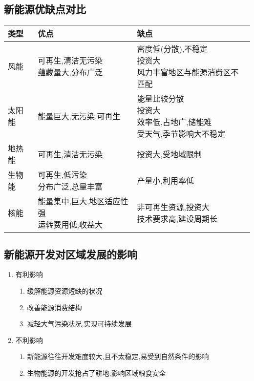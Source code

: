 \documentclass[a4paper]{article}
\begin{document}
    \subsection{新能源优缺点对比}
        \begin{tabular}{|l|l|l}
            \hline
            类型 & 优点 & 缺点 \\
            \hline
            风能 & \makecell[l]{可再生,清洁无污染 \\ 蕴藏量大,分布广泛} & \makecell[l]{密度低(分散),不稳定 \\ 投资大 \\ 风力丰富地区与能源消费区不匹配} \\
            \hline
            太阳能 & 能量巨大,无污染,可再生 & \makecell[l]{能量比较分散 \\ 投资大 \\ 效率低,占地广,储能难 \\ 受天气,季节影响大不稳定} \\
            \hline
            地热能 & 可再生,清洁无污染 & 投资大,受地域限制 \\
            \hline
            生物能 & \makecell[l]{可再生,低污染 \\ 分布广泛,总量丰富} & 产量小,利用率低 \\
            \hline
            核能 & \makecell[l]{能量集中,巨大,地区适应性强 \\ 运转费用低,收益大} & \makecell[l]{非可再生资源,投资大 \\ 技术要求高,建设周期长} \\
            \hline
        \end{tabular}
    \subsection{新能源开发对区域发展的影响}
    \begin{enumerate}
        \item 有利影响
        \begin{enumerate}
            \item 缓解能源资源短缺的状况
            \item 改善能源消费结构
            \item 减轻大气污染状况,实现可持续发展
        \end{enumerate}
        \item 不利影响
        \begin{enumerate}
            \item 新能源往往开发难度较大,且不太稳定,易受到自然条件的影响
            \item 生物能源的开发抢占了耕地,影响区域粮食安全
        \end{enumerate}
    \end{enumerate}
\end{document}
